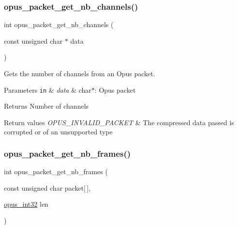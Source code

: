 \subsubsection{\texorpdfstring{opus\+\_\+packet\+\_\+get\+\_\+nb\+\_\+channels()}{opus\_packet\_get\_nb\_channels()}}
{\footnotesize\ttfamily int opus\+\_\+packet\+\_\+get\+\_\+nb\+\_\+channels (\begin{DoxyParamCaption}\item[{const unsigned char $\ast$}]{data }\end{DoxyParamCaption})}



Gets the number of channels from an Opus packet. 


\begin{DoxyParams}[1]{Parameters}
\mbox{\tt in}  & {\em data} & {\ttfamily char$\ast$}\+: Opus packet \\
\hline
\end{DoxyParams}
\begin{DoxyReturn}{Returns}
Number of channels 
\end{DoxyReturn}

\begin{DoxyRetVals}{Return values}
{\em O\+P\+U\+S\+\_\+\+I\+N\+V\+A\+L\+I\+D\+\_\+\+P\+A\+C\+K\+ET} & The compressed data passed is corrupted or of an unsupported type \\
\hline
\end{DoxyRetVals}
\mbox{\label{group__opus__decoder_ga064cb2ed9e77a934cd7db6c13b02c584}} 
\subsubsection{\texorpdfstring{opus\+\_\+packet\+\_\+get\+\_\+nb\+\_\+frames()}{opus\_packet\_get\_nb\_frames()}}
{\footnotesize\ttfamily int opus\+\_\+packet\+\_\+get\+\_\+nb\+\_\+frames (\begin{DoxyParamCaption}\item[{const unsigned char}]{packet\mbox{[}$\,$\mbox{]},  }\item[{\hyperlink{opus__types_8h_aa4d309d6f80b99dbabebc8f98879ab9a}{opus\+\_\+int32}}]{len }\end{DoxyParamCaption})}



